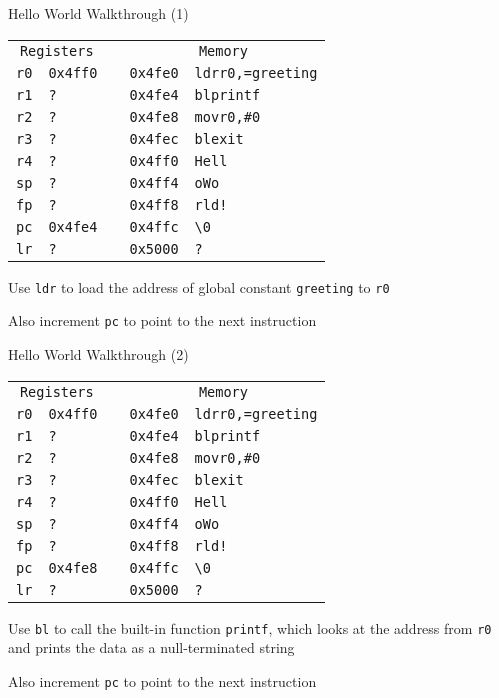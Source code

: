 \begin{frame}{Hello World Walkthrough (1)}
    \begin{alltt}
        \begin{tabular}{ r | l p{5mm} r | l }
            \multicolumn{2}{c}{Registers} && \multicolumn{2}{c}{Memory} \\
            r0 & 0x4ff0 && 0x4fe0 & ldr r0, =greeting \\
            r1 & ? && 0x4fe4 & bl printf \\
            r2 & ? && 0x4fe8 & mov r0, \#0 \\
            r3 & ? && 0x4fec & bl exit \\
            r4 & ? && 0x4ff0 & Hell \\
            sp & ? && 0x4ff4 & o Wo \\
            fp & ? && 0x4ff8 & rld! \\
            pc & 0x4fe4 && 0x4ffc & {\textbackslash}0 \\
            lr & ? && 0x5000 & ? \\
            \end{tabular}
        \end{alltt}

        Use \texttt{ldr} to load the address of global constant \texttt{greeting} to \texttt{r0}
        
        Also increment \texttt{pc} to point to the next instruction

\end{frame}

\begin{frame}{Hello World Walkthrough (2)}
    \begin{alltt}
        \begin{tabular}{ r | l p{5mm} r | l }
            \multicolumn{2}{c}{Registers} && \multicolumn{2}{c}{Memory} \\
            r0 & 0x4ff0 && 0x4fe0 & ldr r0, =greeting \\
            r1 & ? && 0x4fe4 & bl printf \\
            r2 & ? && 0x4fe8 & mov r0, \#0 \\
            r3 & ? && 0x4fec & bl exit \\
            r4 & ? && 0x4ff0 & Hell \\
            sp & ? && 0x4ff4 & o Wo \\
            fp & ? && 0x4ff8 & rld! \\
            pc & 0x4fe8 && 0x4ffc & {\textbackslash}0 \\
            lr & ? && 0x5000 & ? \\
            \end{tabular}
        \end{alltt}

        Use \texttt{bl} to call the built-in function \texttt{printf}, which looks at the address from \texttt{r0} and prints the data as a null-terminated string
        
        Also increment \texttt{pc} to point to the next instruction


\end{frame}

